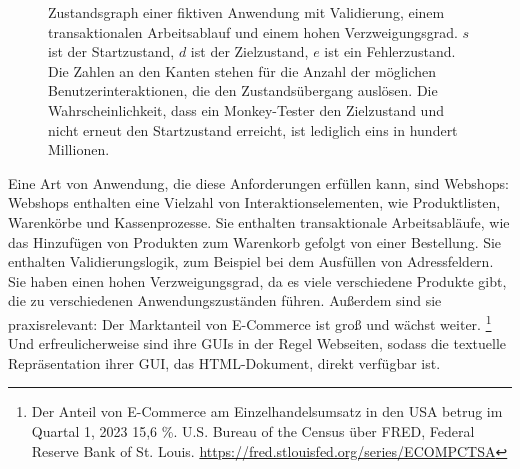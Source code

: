 \begin{figure}
    \centering
    \caption{Zustandsgraph einer fiktiven Anwendung mit Validierung, einem transaktionalen Arbeitsablauf und einem hohen Verzweigungsgrad. $s$ ist der Startzustand, $d$ ist der Zielzustand, $e$ ist ein Fehlerzustand. Die Zahlen an den Kanten stehen für die Anzahl der möglichen Benutzerinteraktionen, die den Zustandsübergang auslösen. Die Wahrscheinlichkeit, dass ein Monkey-Tester den Zielzustand und nicht erneut den Startzustand erreicht, ist lediglich eins in hundert Millionen.}
    \label{fig:sad_monkey}
\end{figure}

Eine Art von Anwendung, die diese Anforderungen erfüllen kann, sind Webshops:
Webshops enthalten eine Vielzahl von Interaktionselementen, wie Produktlisten, Warenkörbe und Kassenprozesse.
Sie enthalten transaktionale Arbeitsabläufe, wie das Hinzufügen von Produkten zum Warenkorb gefolgt von einer Bestellung.
Sie enthalten Validierungslogik, zum Beispiel bei dem Ausfüllen von Adressfeldern.
Sie haben einen hohen Verzweigungsgrad, da es viele verschiedene Produkte gibt, die zu verschiedenen Anwendungszuständen führen.
Außerdem sind sie praxisrelevant: Der Marktanteil von E-Commerce ist groß und wächst weiter.
\footnote{
Der Anteil von E-Commerce am Einzelhandelsumsatz in den USA betrug im Quartal 1, 2023 15,6 \%. \foreignlanguage{english}{U.S. Bureau of the Census} über \foreignlanguage{english}{FRED, Federal Reserve Bank of St. Louis}. \url{https://fred.stlouisfed.org/series/ECOMPCTSA}}
Und erfreulicherweise sind ihre GUIs in der Regel Webseiten, sodass die textuelle Repräsentation ihrer GUI, das HTML-Dokument, direkt verfügbar ist.

